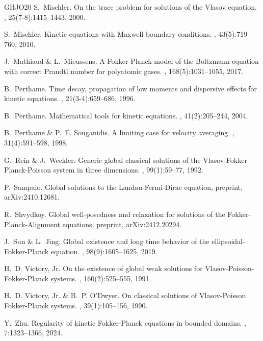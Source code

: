 \documentclass[10pt, reqno]{amsart}
\theoremstyle{plain}
\theoremstyle{definition}
\theoremstyle{remark}
\numberwithin{equation}{section}
\begin{document}
\begin{thebibliography}{GHJO20}
{\sc S.~Mischler.}
\newblock On the trace problem for solutions of the {V}lasov equation.
, 25(7-8):1415--1443, 2000.

{\sc S.~Mischler.}
\newblock Kinetic equations with {M}axwell boundary conditions.
, 43(5):719--760, 2010.

{\sc J.~Mathiaud \& L.~Mieussens.}
\newblock A {F}okker-{P}lanck model of the {B}oltzmann equation with correct {P}randtl number for polyatomic gases.
, 168(5):1031--1055, 2017.

{\sc B.~Perthame.}
\newblock Time decay, propagation of low moments and dispersive effects for kinetic equations.
, 21(3-4):659--686, 1996.

{\sc B.~Perthame.}
\newblock Mathematical tools for kinetic equations.
, 41(2):205--244, 2004.

{\sc B.~Perthame \& P.~E. Souganidis.}
\newblock A limiting case for velocity averaging.
, 31(4):591--598, 1998.

{\sc G.~Rein \& J.~Weckler.}
\newblock Generic global classical solutions of the
  {V}lasov-{F}okker-{P}lanck-{P}oisson system in three dimensions.
, 99(1):59--77, 1992.

{\sc P.~Sampaio.}
\newblock Global solutions to the {L}andau-{F}ermi-{D}irac equation, preprint, arXiv:2410.12681.

{\sc R.~Shvydkoy.}
\newblock Global well-posedness and relaxation for solutions of the {F}okker-{P}lanck-{A}lignment equations, preprint, arXiv:2412.20294.

{\sc J.~Sun \& L.~Jing.}
\newblock Global existence and long time behavior of the ellipsoidal-{F}okker-{P}lanck equation.
, 98(9):1605--1625, 2019.

{\sc H.~D. Victory, Jr.}
\newblock On the existence of global weak solutions for
  {V}lasov-{P}oisson-{F}okker-{P}lanck systems.
, 160(2):525--555, 1991.

{\sc H.~D. Victory, Jr. \& B.~P. O'Dwyer.}
\newblock On classical solutions of {V}lasov-{P}oisson {F}okker-{P}lanck
  systems.
, 39(1):105--156, 1990.

{\sc Y.~Zhu.}
\newblock Regularity of kinetic {F}okker-{P}lanck equations in bounded domains.
, 7:1323--1366, 2024.

\end{thebibliography}
\end{document}
